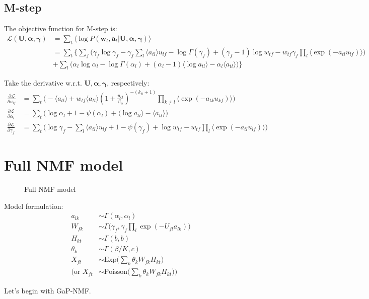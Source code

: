 \documentclass{article}
\begin{document}
\subsection{M-step}
The objective function for M-step is:
\begin{align*}
\mathcal{L}(\mathbf{U}, \bm{\alpha}, \bm{\gamma}) &= \sum_t \langle \log P(\bm{w}_t, \bm{a}_t | \mathbf{U}, \bm{\alpha}, \bm{\gamma}) \rangle \\
&= \sum_t  \biggl\{ \sum_f \Big( \gamma_f \log \gamma_f - \gamma_ f \sum_l \langle a_{tl} \rangle u_{lf} - \log\Gamma(\gamma_f) + (\gamma_f - 1)\log w_{tf} - w_{tf} \gamma_f \prod_l \langle \exp(-a_{tl} u_{lf}) \rangle \Big)  \\
&+ \sum_l  \Big( \alpha_l \log \alpha_l - \log \Gamma(\alpha_l) + (\alpha_l - 1)\langle \log a_{tl} \rangle - \alpha_l \langle a_{tl}  \rangle \Big) \biggl\}
\end{align*}

Take the derivative w.r.t. $\mathbf{U}, \bm{\alpha}, \bm{\gamma}$, respectively:
\begin{align*}
\frac{\partial \mathcal{L}}{\partial u_{lf}} &= \sum_t \biggl( - \langle a_{tl} \rangle + w_{tf} \langle a_{tl} \rangle (1 + \frac{u_{lf}}{\beta_{tl}})^{-(k_{tl}+1)}  \prod_{k \neq l} \langle \exp(-a_{tk} u_{kf}) \rangle \biggl)\\
\frac{\partial \mathcal{L}}{\partial \alpha_l} &=  \sum_t \biggl( \log \alpha_l + 1 - \psi(\alpha_l) + \langle \log a_{tl} \rangle - \langle a_{tl} \rangle \biggl)\\
\frac{\partial \mathcal{L}}{\partial \gamma_f} &= \sum_t \biggl( \log \gamma_f - \sum_l \langle a_{tl} \rangle u_{lf} + 1 - \psi(\gamma_f) + \log w_{tf} - w_{tf} \prod_l \langle \exp(-a_{tl} u_{lf}) \rangle \biggl)
\end{align*}

\section{Full NMF model}
\begin{figure}[ht]
  \centering
      
  \caption{Full NMF model}
\label{fig:plate}
\end{figure}

Model formulation:
\begin{align*}
a_{lk} &\sim \Gamma(\alpha_l, \alpha_l)\\
W_{fk} &\sim \Gamma\Big(\gamma_f, \gamma_f \prod_l \exp(-U_{fl} a_{lk})\Big)\\
H_{kt} &\sim \Gamma(b, b)\\
\theta_k &\sim \Gamma(\beta/K, c)\\
X_{ft} &\sim \text{Exp}\Big(\sum_k \theta_k W_{fk} H_{kt}\Big)\\
\biggl(\text{or } X_{ft} &\sim \text{Poisson}\Big(\sum_k \theta_k W_{fk} H_{kt}\Big)\biggl)
\end{align*}

Let's begin with GaP-NMF.
\end{document}
